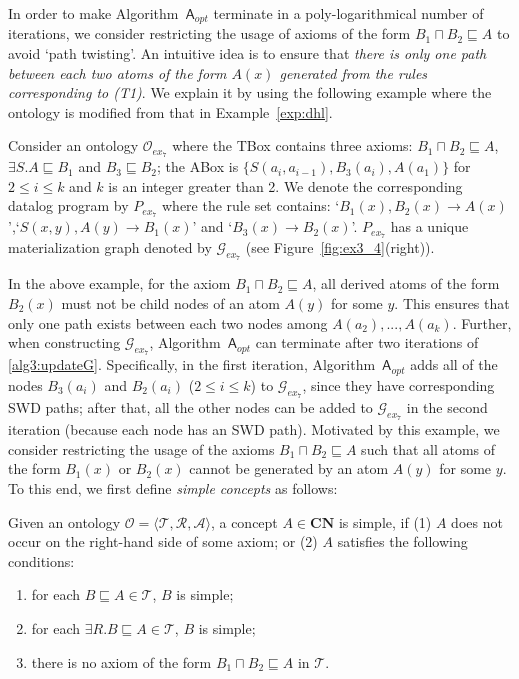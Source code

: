 \documentclass[final,1p,times]{elsarticle}
\begin{document}
In order to make Algorithm~$\mathsf{A}_{opt}$ terminate in a poly-logarithmical number of iterations,
we consider restricting the usage of axioms of the form $B_1\sqcap B_2\sqsubseteq A$
to avoid `path twisting'. An intuitive idea is to
ensure that \emph{there is only one path between each two atoms of the form $A(x)$
generated from the rules corresponding to (T1)}.
We explain it by using the following example where the ontology is modified from
that in Example~\ref{exp:dhl}.

\begin{example}\label{exp:simpleC}
Consider an ontology $\mathcal{O}_{ex_7}$ where the TBox contains three axioms:
$B_1\sqcap B_2\sqsubseteq A$, $\exists S.A\sqsubseteq B_1$ and $B_3\sqsubseteq B_2$;
the ABox is $\{S(a_i,a_{i-1}), B_3(a_i), A(a_1)\}$
for $2\leq i\leq k$ and $k$ is an integer greater than 2.
We denote the corresponding datalog program by $P_{ex_7}$ where the rule set contains:
`$B_1(x),B_2(x)\rightarrow A(x)$',`$S(x,y),A(y)\rightarrow B_1(x)$' and `$B_3(x)\rightarrow B_2(x)$'.
$P_{ex_7}$ has a unique materialization graph denoted by $\mathcal{G}_{ex_7}$ (see Figure~\ref{fig:ex3_4}(right)).
\end{example}

In the above example, for the axiom $B_1\sqcap B_2\sqsubseteq A$, all derived atoms
of the form $B_2(x)$ must not be child nodes of an atom $A(y)$ for some $y$.
This ensures that only one path exists between each two nodes among $A(a_2),...,A(a_k)$.
Further, when constructing $\mathcal{G}_{ex_7}$, Algorithm~$\mathsf{A}_{opt}$ can terminate after
two iterations of \ref{alg3:updateG}. Specifically, in the first iteration, Algorithm~$\mathsf{A}_{opt}$
adds all of the nodes $B_3(a_i)$ and $B_2(a_i)$ ($2\leq i\leq k$) to $\mathcal{G}_{ex_7}$,
since they have corresponding SWD paths;
after that, all the other nodes
can be added to $\mathcal{G}_{ex_7}$ in the second iteration (because each
node has an SWD path).
Motivated by this example, we consider restricting the usage of
the axioms $B_1\sqcap B_2\sqsubseteq A$
such that all atoms of the form $B_1(x)$ or $B_2(x)$ cannot be generated by an atom $A(y)$
for some $y$.
To this end, we first define \emph{simple concepts} as follows:

\begin{definition}
Given an ontology $\mathcal{O}=\langle\mathcal{T},\mathcal{R},\mathcal{A}\rangle$,
a concept $A\in\textbf{CN}$ is simple, if (1) $A$ does not occur on the right-hand side
of some axiom; or (2) $A$ satisfies the following conditions:
\begin{enumerate}[leftmargin=4ex,label=\arabic*.]
\item for each $B\sqsubseteq A\in\mathcal{T}$, $B$ is simple;
\item for each $\exists R.B\sqsubseteq A\in\mathcal{T}$, $B$ is simple;
\item there is no axiom of the form $B_1\sqcap B_2\sqsubseteq A$ in $\mathcal{T}$.
\end{enumerate}
\end{definition}
\end{document}
